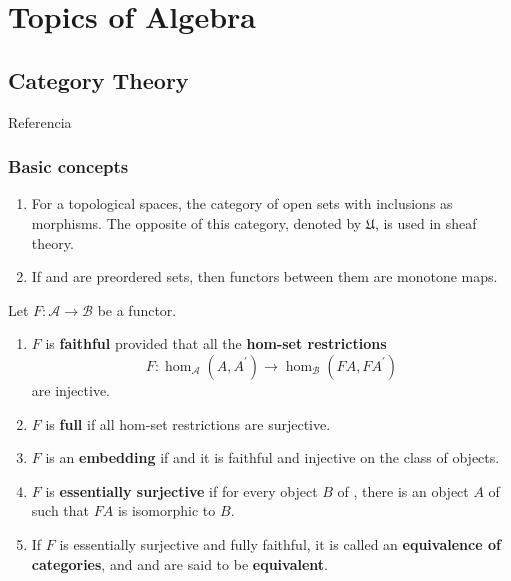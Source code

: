 \part{Topics of Algebra}

\chapter{Category Theory}

Referencia \cite{adamekAbstractConcreteCategories}

\section*{Basic concepts}

\begin{enumerate}
    \item For a topological spaces, the category of open sets with inclusions as morphisms. The opposite of this category, denoted by $\mathfrak{U}$, is used in sheaf theory.
    \item If \ca and \cb are preordered sets, then functors between them are monotone maps.
\end{enumerate}


\noindent Let $F: \mathcal{A} \rightarrow \mathcal{B}$ be a functor.
\begin{enumerate}
    \item $F$ is \textbf{faithful} provided that all the \textbf{hom-set restrictions}
    $$
    F: \operatorname{hom}_{\mathcal{A}}\left(A, A^{\prime}\right) \rightarrow \operatorname{hom}_{\mathcal{B}}\left(F A, F A^{\prime}\right)
    $$
    are injective.
    \item $F$ is \textbf{full} if all hom-set restrictions are surjective.
    \item $F$ is an \textbf{embedding} if and it is faithful and injective on the class of objects.
    \item $F$ is \textbf{essentially surjective} if for every object $B$ of \cb, there is an object $A$ of \ca such that $F A$ is isomorphic to $B$. 
    \item If $F$ is essentially surjective and fully faithful, it is called an \textbf{equivalence of categories}, and \ca and \cb are said to be \textbf{equivalent}.
\end{enumerate}


